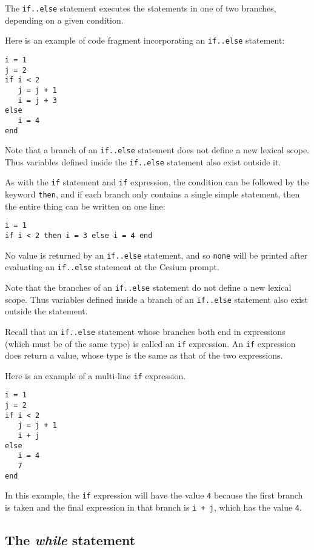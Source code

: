 \documentclass[a4paper,10pt]{article}
\newcommand{\code}{\lstinline}
\begin{document}
{The \code{if..else} statement executes the statements in one of two branches, depending on a given
condition.

Here is an example of code fragment incorporating an \code{if..else} statement:

\begin{lstlisting}
i = 1
j = 2
if i < 2
   j = j + 1
   i = j + 3
else
   i = 4
end
\end{lstlisting}

Note that a branch of an \code{if..else} statement does not define a new lexical scope. Thus
variables defined inside the \code{if..else} statement also exist outside it.

As with the \code{if} statement and \code{if} expression, the condition can be followed by the keyword
\code{then}, and if each branch only contains a single simple statement, then the entire thing can
be written on one line:

\begin{lstlisting}
i = 1
if i < 2 then i = 3 else i = 4 end
\end{lstlisting}

No value is returned by an \code{if..else} statement, and so \code{none} will be printed after
evaluating an \code{if..else} statement at the Cesium prompt.

Note that the branches of an \code{if..else} statement do not define a new lexical scope. Thus
variables defined inside a branch of an \code{if..else} statement also exist outside the statement.

Recall that an \code{if..else} statement whose branches both end in expressions (which must be of 
the same type) is called an \code{if} expression. An \code{if} expression does return a value, whose 
type is the same as that of the two expressions. 

Here is an example of a multi-line \code{if} expression.

\begin{lstlisting}
i = 1
j = 2
if i < 2
   j = j + 1
   i + j
else
   i = 4
   7
end
\end{lstlisting}

In this example, the \code{if} expression will have the value \code{4} because the first branch is 
taken and the final expression in that branch is \code{i + j}, which has the value \code{4}.

\subsection{The \textit{while} statement}

}
\end{document}
